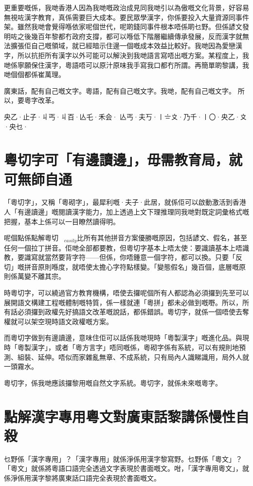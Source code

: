 更重要嘅係，我哋香港人因為我哋嘅政治成見同我哋引以為傲嘅文化背景，好容易無視咗漢字教育，真係需要巨大成本。要民眾學漢字，你係要投入大量資源同事件架。雖然我哋會覺得喺依家呢個世代，呢啲錢同事件根本唔係啲乜野。但係諺文發明咗之後幾百年黎都冇政府支撐，都可以喺低下階層繼續傳承發展，反而漢字就無法擴張佢自己嘅領域，就已經暗示住邊一個嘅成本效益比較好。我哋因為愛戀漢字，所以抗拒所有漢字以外可能可以解決到我哋語言寫唔出嘅方案。某程度上，我哋係寧願保住漢字，粵語唔可以原汁原味我手寫我口都冇所謂。再簡單啲黎講，我哋個個都係崔萬理。

廣東話，配有自己嘅文字。粵語，配有自己嘅文字。我哋，配有自己嘅文字。
所以，要粵字改革。

央乙·止子·丩丐·丩百·亾乇·禾会·
亾丐·夫丂·〡〧〩·乃千·〡〇·央乙·〩·央乜·




\chapter{粵切字可「有邊讀邊」，毋需教育局，就可無師自通}

「粵切字」，又稱「粵砌字」，最犀利嘅·夫子·此居，就係佢可以啟動激活到香港人「有邊讀邊」嘅閱讀漢字能力，加上透過上文下理推理同我哋對既定詞彙格式嘅把握，基本上係可以一目瞭然讀得明。

呢個點係點解粵切$_{easily}$比所有其他拼音方案優勝嘅原因，包括諺文、假名，甚至任何一個拉丁拼音。佢哋全部都要教，但粵切字基本上唔太使：要識讀基本上唔識教，要識寫就當然要背字符——但係，你唔鍾意一個字符，都可以換。只要「反切」嘅拼音原則喺度，就唔使太擔心字符點樣變。「變態假名」幾百個，底層嘅原則係萬變不離其宗。

時粵切字，可以繞過官方教育機構，唔使去攞呢個所有人都認為必須攞到先至可以展開語文構建工程嘅體制嘅特質，係一樣就連「粵拼」都未必做到嘅嘢。所以，所有話必須攞到政權先好搞語文改革嘅說話，都係錯誤。粵切字，就係一個唔使去奪權就可以架空現時語文政權嘅方案。

而粵切字做到有邊讀邊，意味住佢可以話係我哋現時「粵製漢字」嘅進化品。與現時「粵製漢字」，或者「粵方言字」唔同嘅係，粵砌字係有系統，可以有規則地預測、組裝、延伸。唔似而家雜亂無章、不成系統，只有局內人識睇識用，局外人就一頭霧水。

粵切字，係我哋應該攞黎用嘅自然文字系統。粵切字，就係未來嘅粵字。


\chapter{點解漢字專用粵文對廣東話黎講係慢性自殺}
乜野係「漢字專用」？「漢字專用」就係淨係用漢字黎寫野。乜野係「粵文」？「粵文」就係將粵語口語完全透過文字表現於書面嘅文。咁，「漢字專用粵文」，就係淨係用漢字黎將廣東話口語完全表現於書面嘅文。

